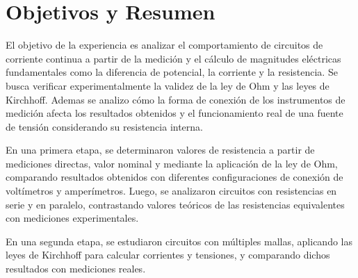 \section{Objetivos y Resumen}

El objetivo de la experiencia es analizar el comportamiento de circuitos de corriente continua a partir de la medición y el cálculo de magnitudes eléctricas fundamentales como la diferencia de potencial, la corriente y la resistencia. Se busca verificar experimentalmente la validez de la ley de Ohm y las leyes de Kirchhoff. Ademas se analizo cómo la forma de conexión de los instrumentos de medición afecta los resultados obtenidos y el funcionamiento real de una fuente de tensión considerando su resistencia interna.

En una primera etapa, se determinaron valores de resistencia a partir de mediciones directas, valor nominal y mediante la aplicación de la ley de Ohm, comparando resultados obtenidos con diferentes configuraciones de conexión de voltímetros y amperímetros. Luego, se analizaron circuitos con resistencias en serie y en paralelo, contrastando valores teóricos de las resistencias equivalentes con mediciones experimentales.

En una segunda etapa, se estudiaron circuitos con múltiples mallas, aplicando las leyes de Kirchhoff para calcular corrientes y tensiones, y comparando dichos resultados con mediciones reales.


\newpage